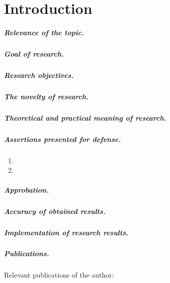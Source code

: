 \chapter*{Introduction}                         %


\paragraph*{Relevance of the topic.}
\paragraph*{Goal of research.}
\paragraph*{Research objectives.}
\paragraph*{The novelty of research.}
\paragraph*{Theoretical and practical meaning of research.}
\paragraph*{Assertions presented for defense.}
\begin{enumerate}
    \item \statementOneEN
    \item \statementTwoEN
\end{enumerate}

\paragraph*{Approbation.}
\paragraph*{Accuracy of obtained results.}
\paragraph*{Implementation of research results.}
\paragraph*{Publications.}
Relevant publications of the author:
\begin{refsection}
\nocite{*}
\printbibliography[
    keyword=own,
    heading=none,
    resetnumbers=true
]
\end{refsection}

